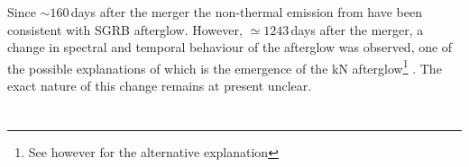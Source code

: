 Since ${\sim}160\,$days after the merger the non-thermal emission from \GW{} have been 
consistent with \ac{SGRB} afterglow. However, ${\simeq}1243\,$days after the merger, a 
change in spectral and temporal behaviour of the afterglow was observed, one of the 
possible explanations of which is the emergence of the \ac{kN} afterglow\footnote{
    See however \citet{Troja:2021xsw} for the alternative explanation
} \citep{Hajela:2021faz}.
The exact nature of this change remains at present unclear. 















\section{\pyblast{}} \label{sec:afterglow:code}

\def\eq{\text{equation}}
\def\eqs{\text{equations}}

